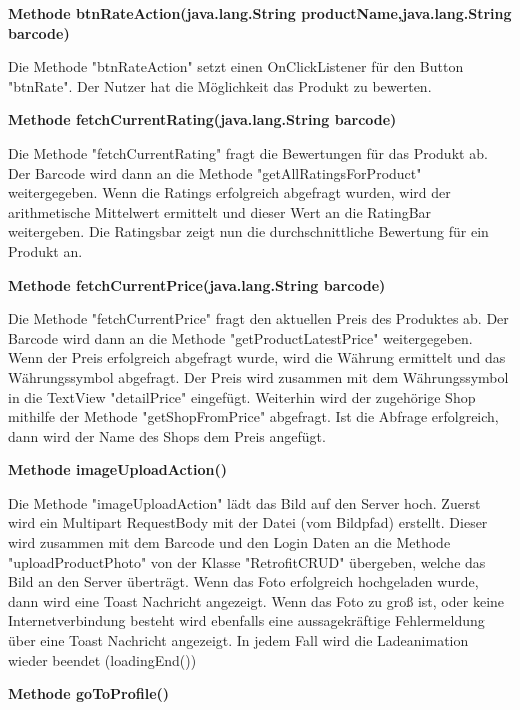 \documentclass{scrartcl}
\begin{document}
\noindent\textbf{Methode btnRateAction(java.lang.String productName,\newline               java.lang.String barcode)} 

\noindent Die Methode "btnRateAction" setzt einen OnClickListener für den Button "btnRate". Der Nutzer hat die Möglichkeit das Produkt zu bewerten. \newline 

\noindent\textbf{Methode fetchCurrentRating(java.lang.String barcode)} 

\noindent Die Methode "fetchCurrentRating" fragt die Bewertungen für das Produkt ab. Der Barcode wird dann an die Methode "getAllRatingsForProduct" weitergegeben. Wenn die Ratings erfolgreich abgefragt wurden, wird der arithmetische Mittelwert ermittelt und dieser Wert an die RatingBar weitergeben. Die Ratingsbar zeigt nun die durchschnittliche Bewertung für ein Produkt an. \newline 

\noindent\textbf{Methode fetchCurrentPrice(java.lang.String barcode)} 

\noindent Die Methode "fetchCurrentPrice" fragt den aktuellen Preis des Produktes ab. Der Barcode wird dann an die Methode "getProductLatestPrice" weitergegeben. Wenn der Preis erfolgreich abgefragt wurde, wird die Währung ermittelt und das Währungssymbol abgefragt. Der Preis wird zusammen mit dem Währungssymbol in die TextView "detailPrice" eingefügt. Weiterhin wird der zugehörige Shop mithilfe der Methode "getShopFromPrice" abgefragt. Ist die Abfrage erfolgreich, dann wird der Name des Shops dem Preis angefügt. \newline

\noindent\textbf{Methode imageUploadAction()} 

\noindent Die Methode "imageUploadAction" lädt das Bild auf den Server hoch. Zuerst wird ein Multipart RequestBody mit der Datei (vom Bildpfad) erstellt. Dieser wird zusammen mit dem Barcode und den Login Daten an die Methode "uploadProductPhoto" von der Klasse "RetrofitCRUD" übergeben, welche das Bild an den Server überträgt. Wenn das Foto erfolgreich hochgeladen wurde, dann wird eine Toast Nachricht angezeigt. Wenn das Foto zu groß ist, oder keine Internetverbindung besteht wird ebenfalls eine aussagekräftige Fehlermeldung über eine Toast Nachricht angezeigt. In jedem Fall wird die Ladeanimation wieder beendet (loadingEnd()) \newline 

\noindent\textbf{Methode goToProfile()} 
\end{document}
